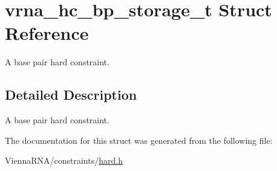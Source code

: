 \hypertarget{structvrna__hc__bp__storage__t}{}\section{vrna\+\_\+hc\+\_\+bp\+\_\+storage\+\_\+t Struct Reference}
\label{structvrna__hc__bp__storage__t}


A base pair hard constraint.  




\subsection{Detailed Description}
A base pair hard constraint. 

The documentation for this struct was generated from the following file\+:\begin{DoxyCompactItemize}
\item 
Vienna\+R\+N\+A/constraints/\mbox{\hyperlink{hard_8h}{hard.\+h}}\end{DoxyCompactItemize}

